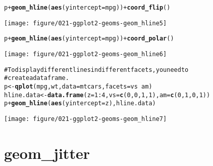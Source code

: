 \documentclass[a4paper,titlepage]{tufte-handout}\usepackage{graphicx, color}
\makeatletter
\def\maxwidth{ %
  \ifdim\Gin@nat@width>\linewidth
    \linewidth
  \else
    \Gin@nat@width
  \fi
}
\newcommand{\hlfunctioncall}[1]{\textcolor[rgb]{0.501960784313725,0,0.329411764705882}{\textbf{#1}}}%
\newcommand{\hlcomment}[1]{\textcolor[rgb]{0.180392156862745,0.6,0.341176470588235}{#1}}%
\newenvironment{kframe}{%
 \def\at@end@of@kframe{}%
 \ifinner\ifhmode%
  \def\at@end@of@kframe{\end{minipage}}%
  \begin{minipage}{\columnwidth}%
 \fi\fi%
 \def\FrameCommand##1{\hskip\@totalleftmargin \hskip-\fboxsep
 \colorbox{shadecolor}{##1}\hskip-\fboxsep
     \hskip-\linewidth \hskip-\@totalleftmargin \hskip\columnwidth}%
 \MakeFramed {\advance\hsize-\width
   \@totalleftmargin\z@ \linewidth\hsize
   \@setminipage}}%
 {\par\unskip\endMakeFramed%
 \at@end@of@kframe}
\newenvironment{knitrout}{}{} %
\makeatother
\begin{document}
\begin{knitrout}
\begin{kframe}
\begin{alltt}
p + \hlfunctioncall{geom_hline}(\hlfunctioncall{aes}(yintercept=mpg)) + \hlfunctioncall{coord_flip}()
\end{alltt}
\end{kframe}\texttt{[image: figure/021-ggplot2-geoms-geom\_hline5]} \begin{kframe}\begin{alltt}
p + \hlfunctioncall{geom_hline}(\hlfunctioncall{aes}(yintercept=mpg)) + \hlfunctioncall{coord_polar}()
\end{alltt}
\end{kframe}\texttt{[image: figure/021-ggplot2-geoms-geom\_hline6]} \begin{kframe}\begin{alltt}
\hlcomment{# To display different lines in different facets, you need to}
\hlcomment{# create a data frame.}
p <- \hlfunctioncall{qplot}(mpg, wt, data=mtcars, facets = vs ~ am)
hline.data <- \hlfunctioncall{data.frame}(z = 1:4, vs = \hlfunctioncall{c}(0,0,1,1), am = \hlfunctioncall{c}(0,1,0,1))
p + \hlfunctioncall{geom_hline}(\hlfunctioncall{aes}(yintercept = z), hline.data)
\end{alltt}
\end{kframe}\texttt{[image: figure/021-ggplot2-geoms-geom\_hline7]} 
\end{knitrout}


\section{geom\_jitter}
\end{document}
